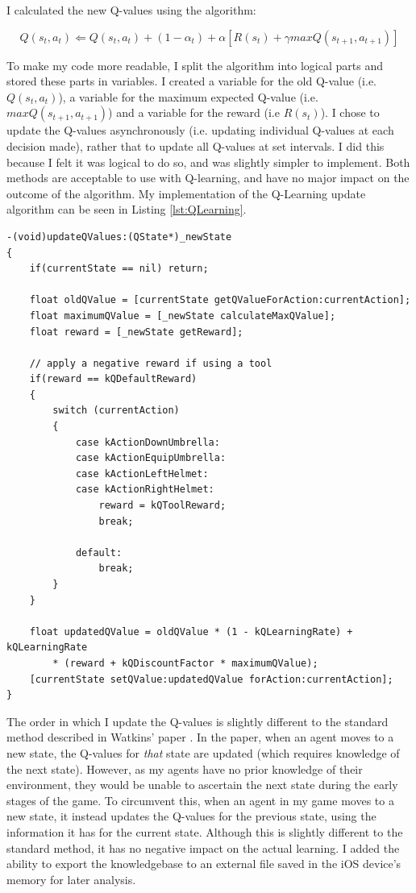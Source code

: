 \documentclass[a4paper,oneside]{report}
\begin{document}
I calculated the new Q-values using the algorithm: 

\begin{equation*}
Q(s_t,a_t) \Leftarrow Q(s_t, a_t) + (1 -\alpha_t) + \alpha[R(s_t) + \gamma max Q(s_{t+1}, a_{t+1})] 
\end{equation*}

To make my code more readable, I split the algorithm into logical parts and stored these parts in variables. I created a variable for the old Q-value (i.e. $Q(s_t, a_t)$), a variable for the maximum expected Q-value (i.e. $max Q(s_{t+1}, a_{t+1})$) and a variable for the reward (i.e $R(s_t)$). I chose to update the Q-values asynchronously (i.e. updating individual Q-values at each decision made), rather that to update all Q-values at set intervals. I did this because I felt it was logical to do so, and was slightly simpler to implement. Both methods are acceptable to use with Q-learning, and have no major impact on the outcome of the algorithm. My implementation of the Q-Learning update algorithm can be seen in Listing \ref{lst:QLearning}.

\begin{lstlisting}[label={lst:QLearning},caption=Implementation of The Q-Learning Algorithm]
-(void)updateQValues:(QState*)_newState
{    
    if(currentState == nil) return;
            
    float oldQValue = [currentState getQValueForAction:currentAction];
    float maximumQValue = [_newState calculateMaxQValue];
    float reward = [_newState getReward];
    
    // apply a negative reward if using a tool
    if(reward == kQDefaultReward) 
    {
        switch (currentAction)
        {
            case kActionDownUmbrella:
            case kActionEquipUmbrella:
            case kActionLeftHelmet:
            case kActionRightHelmet:
                reward = kQToolReward;
                break;
                
            default:
                break;
        } 
    }
        
    float updatedQValue = oldQValue * (1 - kQLearningRate) + kQLearningRate 
    	* (reward + kQDiscountFactor * maximumQValue);
    [currentState setQValue:updatedQValue forAction:currentAction];
}
\end{lstlisting}

The order in which I update the Q-values is slightly different to the standard method described in Watkins' paper \cite{Watkins:1989mi}. In the paper, when an agent moves to a new state, the Q-values for \emph{that} state are updated (which requires knowledge of the next state). However, as my agents have no prior knowledge of their environment, they would be unable to ascertain the next state during the early stages of the game. To circumvent this, when an agent in my game moves to a new state, it instead updates the Q-values for the previous state, using the information it has for the current state. Although this is slightly different to the standard method, it has no negative impact on the actual learning. I added the ability to export the knowledgebase to an external file saved in the iOS device's memory for later analysis.
\end{document}
